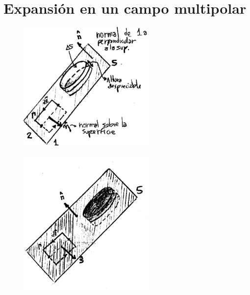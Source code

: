 \documentclass[10pt,oneside]{CBFT_book}
\begin{document}
\chapter{Expansión en un campo multipolar}


\begin{figure}[htb]
	\begin{center}
	\includegraphics[width=0.6\textwidth]{images/fig_ft1_contorno1.pdf}	 
	\end{center}
	\caption{}
\end{figure} 

\begin{figure}[htb]
	\begin{center}
	\includegraphics[width=0.6\textwidth]{images/fig_ft1_contorno2.pdf}	 
	\end{center}
	\caption{}
\end{figure} 
\end{document}
